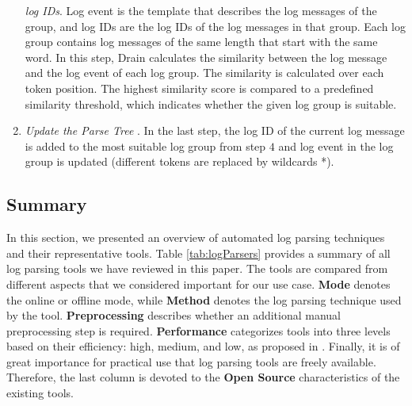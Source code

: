 \begin{enumerate}
        \textit{log IDs}. Log event is the template that describes the log messages of the group, and log IDs are the log IDs of the log messages in that group. Each log group contains log messages of the same length that start with the same word. In this step, Drain calculates the similarity between the log message and the log event of each log group. The similarity is calculated over each token position. The highest similarity score is compared to a predefined similarity threshold, which indicates whether the given log group is suitable. \item \textit{Update the Parse Tree }. In the last step, the log ID of the current log message is added to the most suitable log group from step $4$ and log event in the log group is updated (different tokens are replaced by wildcards *).
    \end{enumerate}

    \subsection{Summary} \label{parser_summary}
    In this section, we presented an overview of automated log parsing techniques and their representative tools. Table \ref{tab:logParsers} provides a summary of all log parsing tools we have reviewed in this paper. The tools are compared from different aspects that we considered important for our use case. \textbf{Mode} denotes the online or offline mode, while \textbf{Method} denotes the log parsing technique used by the tool. \textbf{Preprocessing} describes whether an additional manual preprocessing step is required. \textbf{Performance} categorizes tools into three levels based on their efficiency: high, medium, and low, as proposed in \cite{zhlhxzl2018}. Finally, it is of great importance for practical use that log parsing tools are freely available. Therefore, the last column is devoted to the \textbf{Open Source} characteristics of the existing tools.
    
    \begin{table}[t]
    \centering
    \caption{Summary of automated log parsing tools}
    \label{tab:logParsers}
    \end{table} 
    
